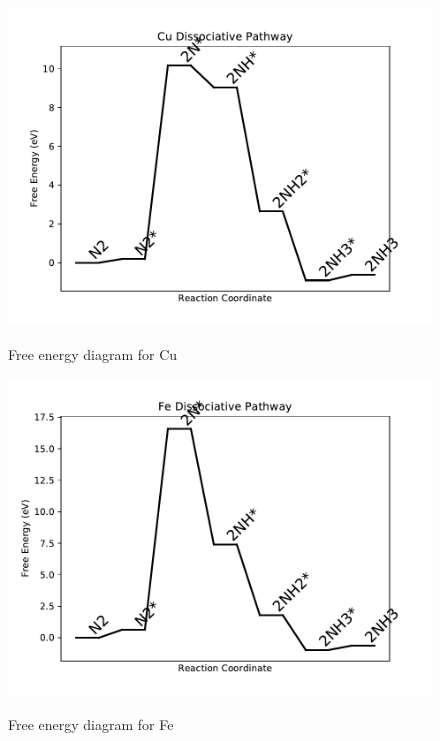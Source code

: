 \documentclass{article}
\begin{document}
\begin{figure}
\includegraphics[width=1\linewidth]{data/plots/Cu_dissociative.pdf}
\label{fig:Cu_dissociative}
\caption{Free energy diagram for Cu}
\end{figure}

\clearpage
\begin{figure}
\includegraphics[width=1\linewidth]{data/plots/Fe_dissociative.pdf}
\label{fig:Fe_dissociative}
\caption{Free energy diagram for Fe}
\end{figure}
\end{document}
